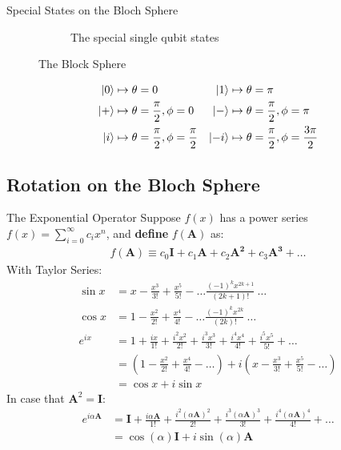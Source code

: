 \documentclass{beamer}
\begin{document}
\begin{frame}{Special States on the Bloch Sphere}
{\begin{figure}
\begin{subfigure}[b]{0.5\textwidth}
      \caption{The special single qubit states\tiny\cite{singlequbitstates}}
    \end{subfigure}
    \caption{The Block Sphere}
  \end{figure}
  \begin{align*}
  \ket0 &\mapsto \theta = 0                     & \ket1 &\mapsto \theta = \pi \\
  \ket+ &\mapsto \theta = \frac{\pi}2, \phi = 0 & \ket- &\mapsto \theta = \frac{\pi}2, \phi = \pi \\
  \ket{i} &\mapsto \theta = \frac{\pi}2, \phi = \frac{\pi}2 & \ket{-i} &\mapsto \theta = \frac{\pi}2, \phi = \frac{3\pi}2
  \end{align*}
  }%
\end{frame}

\subsection{Rotation on the Bloch Sphere}
\begin{frame}{The Exponential Operator\tiny\cite{rotationsonblochsphere}}
  {\tiny
    Suppose $f(x)$ has a power series $f(x) = \sum_{i=0}^{\infty}c_ix^n$, and \textbf{define} $f(\mathbf{A})$ as:
    \begin{align*}
    f(\mathbf{A}) \equiv c_0\mathbf{I} + c_1\mathbf{A} + c_2\mathbf{A^2} + c_3\mathbf{A^3} + \dots
    \end{align*}
    With Taylor Series:
    \begin{align*}
      \sin{x} &= x - \frac{x^3}{3!} + \frac{x^5}{5!} - \dots \frac{(-1)^kx^{2k+1}}{(2k+1)!}\ \dots \\
      \cos{x} &= 1 - \frac{x^2}{2!} + \frac{x^4}{4!} - \dots \frac{(-1)^kx^{2k}}{(2k)!}\ \dots \\
      e^{ix} &= 1 + \frac{ix}{1!} + \frac{i^2x^2}{2!} + \frac{i^3x^3}{3!}+ \frac{i^4x^4}{4!} + \frac{i^5x^5}{5!} + \dots \\
             &= (1 - \frac{x^2}{2!} + \frac{x^4}{4!} - \dots) + i(x - \frac{x^3}{3!} + \frac{x^5}{5!} - \dots) \\
             &= \cos{x} + i\sin{x}
    \end{align*}
    In case that $\mathbf{A}^2=\mathbf{I}$:
    \begin{align*}
      e^{i\alpha\mathbf{A}} &= \mathbf{I}
                                 + \frac{i\alpha\mathbf{A}}{1!}
                                 + \frac{i^2(\alpha\mathbf{A})^2}{2!}
                                 + \frac{i^3(\alpha\mathbf{A})^3}{3!}
                                 + \frac{i^4(\alpha\mathbf{A})^4}{4!}
                                 + \dots \\
                            &= \cos(\alpha)\mathbf{I} + i\sin(\alpha)\mathbf{A}
    \end{align*}
  }%
\end{frame}
\end{document}
